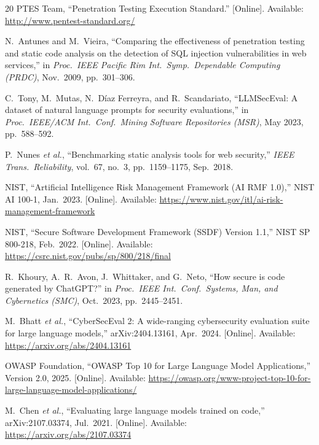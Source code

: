 \documentclass[conference,a4paper]{IEEEtran}
\begin{document}
\begin{thebibliography}{20}
PTES Team, ``Penetration Testing Execution Standard.'' [Online]. Available: \url{http://www.pentest-standard.org/}

N.~Antunes and M.~Vieira, ``Comparing the effectiveness of penetration testing and static code analysis on the detection of SQL injection vulnerabilities in web services,'' in \emph{Proc.\ IEEE Pacific Rim Int.\ Symp.\ Dependable Computing (PRDC)}, Nov.\ 2009, pp.~301--306.

C.~Tony, M.~Mutas, N.~D\'{i}az Ferreyra, and R.~Scandariato, ``LLMSecEval: A dataset of natural language prompts for security evaluations,'' in \emph{Proc.\ IEEE/ACM Int.\ Conf.\ Mining Software Repositories (MSR)}, May 2023, pp.~588--592.

P.~Nunes \emph{et al.}, ``Benchmarking static analysis tools for web security,'' \emph{IEEE Trans.\ Reliability}, vol.~67, no.~3, pp.~1159--1175, Sep.\ 2018.

NIST, ``Artificial Intelligence Risk Management Framework (AI RMF 1.0),'' NIST AI 100-1, Jan.\ 2023. [Online]. Available: \url{https://www.nist.gov/itl/ai-risk-management-framework}

NIST, ``Secure Software Development Framework (SSDF) Version 1.1,'' NIST SP 800-218, Feb.\ 2022. [Online]. Available: \url{https://csrc.nist.gov/pubs/sp/800/218/final}

R.~Khoury, A.~R.~Avon, J.~Whittaker, and G.~Neto, ``How secure is code generated by ChatGPT?'' in \emph{Proc.\ IEEE Int.\ Conf.\ Systems, Man, and Cybernetics (SMC)}, Oct.\ 2023, pp.~2445--2451.

M.~Bhatt \emph{et al.}, ``CyberSecEval 2: A wide-ranging cybersecurity evaluation suite for large language models,'' arXiv:2404.13161, Apr.\ 2024. [Online]. Available: \url{https://arxiv.org/abs/2404.13161}

OWASP Foundation, ``OWASP Top 10 for Large Language Model Applications,'' Version 2.0, 2025. [Online]. Available: \url{https://owasp.org/www-project-top-10-for-large-language-model-applications/}

M.~Chen \emph{et al.}, ``Evaluating large language models trained on code,'' arXiv:2107.03374, Jul.\ 2021. [Online]. Available: \url{https://arxiv.org/abs/2107.03374}

\end{thebibliography}
\end{document}
